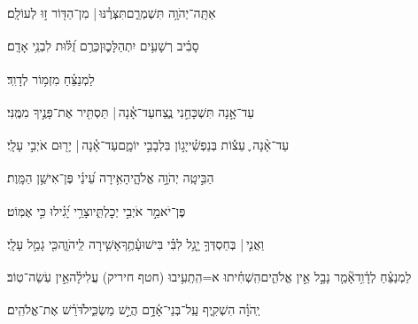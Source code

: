 \documentclass[12pt]{article}
\newcommand{\loc}[1]{\textsuperscript{\locf{#1}}}
\begin{document}
{\loc{ ח}~}‏אַתָּֽה־יְהֹוָ֥ה תִּשְׁמְרֵ֑ם{\hfill}תִּצְּרֶ֓נּוּ |  מִן־הַדּ֖וֹר ז֣וּ לְעוֹלָֽם׃\par

{\loc{ ט}~}‏סָבִ֗יב רְשָׁעִ֥ים יִתְהַלָּכ֑וּן{\hfill}כְּרֻ֥ם זֻ֝לּ֗וּת לִבְנֵ֥י אָדָֽם׃\par\pend
\ledpb
\pstart[\subsection*{\textcolor{red}{פרק יג}}]\label{פרק יג}
{\loc{ א}~}‏לַמְנַצֵּ֗חַ מִזְמ֥וֹר לְדָוִֽד׃\par

{\loc{ ב}~}‏עַד־אָ֣נָה  תִּשְׁכָּחֵ֣נִי נֶ֑צַח{\hfill}עַד־אָ֓נָה |  תַּסְתִּ֖יר אֶת־פָּנֶ֣יךָ מִמֶּֽנִּי׃\par

{\loc{ ג}~}‏עַד־אָ֨נָה ֪ עֵצ֡וֹת בְּנַפְשִׁ֗י{\hfill}יָג֣וֹן בִּלְבָבִ֣י יוֹמָ֑ם\newline\hspace*{.5em}עַד־אָ֓נָה | {\hfill}יָר֖וּם אֹיְבִ֣י עָלָֽי׃\par

{\loc{ ד}~}‏הַבִּ֣יטָֽה  יְהֹוָ֣ה אֱלֹהָ֑י{\hfill}הָאִ֥ירָה עֵ֝ינַ֗י פֶּן־אִישַׁ֥ן הַמָּֽוֶת׃\par

{\loc{ ה}~}‏פֶּן־יֹאמַ֣ר אֹיְבִ֣י יְכׇלְתִּ֑יו{\hfill}צָרַ֥י יָ֝גִ֗ילוּ כִּ֣י אֶמּֽוֹט׃\par

{\loc{ ו}~}‏וַאֲנִ֤י |  בְּחַסְדְּךָ֣ {\hfill}יָ֤גֵ֥ל לִבִּ֗י בִּישׁוּעָ֫תֶ֥ךָ\newline\hspace*{.5em}אָשִׁ֥ירָה לַֽיהֹוָ֑ה{\hfill}כִּ֖י גָמַ֣ל עָלָֽי׃\par\pend

\pstart[\subsection*{\textcolor{red}{פרק יד}}]\label{פרק יד}
{\loc{ א}~}‏לַמְנַצֵּ֗חַ לְדָ֫וִ֥ד\newline\hspace*{.5em}אָ֘מַ֤ר נָבָ֣ל {\hfill}אֵ֣ין אֱלֹהִ֑ים\newline\hspace*{.5em}הִֽשְׁחִ֗יתוּ א=הִֽתְִעִ֥יבוּ (חטף חיריק) עֲלִילָ֗ה{\hfill}אֵ֣ין עֹֽשֵׂה־טֽוֹב׃\par

{\loc{ ב}~}‏יְֽהֹוָ֗ה {\hfill}הִשְׁקִ֢יף עַֽל־בְּנֵי־אָ֫דָ֥ם\newline\hspace*{.5em} הֲיֵ֣שׁ מַשְׂכִּ֑יל{\hfill}דֹּ֝רֵ֗שׁ אֶת־אֱלֹהִֽים׃\par
\end{document}
